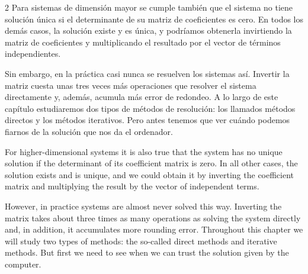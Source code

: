 \begin{paracol}{2}
Para sistemas de dimensión mayor se cumple también que el sistema no tiene solución única si el determinante de su matriz de coeficientes es cero. En todos los demás casos, la solución existe y es única, y podríamos obtenerla invirtiendo la matriz de coeficientes y multiplicando el resultado por el vector de términos independientes.

Sin embargo, en la práctica casi nunca se resuelven los sistemas así. Invertir la matriz cuesta unas tres veces más operaciones que resolver el sistema directamente y, además, acumula más error de redondeo. A lo largo de este capítulo estudiaremos dos tipos de métodos de resolución: los llamados métodos directos y los métodos iterativos. Pero antes tenemos que ver cuándo podemos fiarnos de la solución que nos da el ordenador.

\switchcolumn
For higher-dimensional systems it is also true that the system has no unique solution if the determinant of its coefficient matrix is zero. In all other cases, the solution exists and is unique, and we could obtain it by inverting the coefficient matrix and multiplying the result by the vector of independent terms.

However, in practice systems are almost never solved this way. Inverting the matrix takes about three times as many operations as solving the system directly and, in addition, it accumulates more rounding error. Throughout this chapter we will study two types of methods: the so-called direct methods and iterative methods. But first we need to see when we can trust the solution given by the computer.
\end{paracol}

